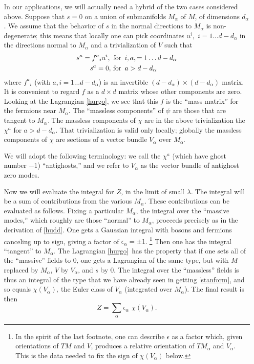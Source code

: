 \documentclass[12pt]{article}
\numberwithin{equation}{section}
\begin{document}
In our applications, we will actually need a hybrid of the two cases
considered above.  Suppose that $s=0$ on a union of submanifolds $M_\alpha$
of $M$, of dimensions $d_\alpha$.  We assume that the behavior of $s$ in
the normal directions to $M_\alpha$ is non-degenerate; this means that locally
one can pick coordinates $u^i,\,\,i=1\dots d-d_\alpha$
in the directions normal to $M_\alpha$ and a trivialization of $V$ such that
\begin{equation}
  \label{locoform}
  \begin{aligned}
    s^a = f^a{}_iu^i, \,\,\,&{\rm for}\,\,\,i,a,=1\dots d-d_\alpha\\
    s^a=0, \,\,&{\rm  for}\,\,\, a>d-d_\alpha \\
  \end{aligned}
\end{equation}
where $f^a{}_i$ (with $a,i=1\dots d-d_\alpha$) is  an invertible
$(d-d_\alpha)\times (d-d_\alpha)$
matrix.   It is convenient to regard $f$ as a $d\times d$ matrix whose
other components are zero.
Looking at the Lagrangian \eqref{hurgo}, we see that this $f$ is the
``mass matrix'' for the fermions near $M_\alpha$. The ``massless
components'' of $\psi$ are those that are tangent to $M_\alpha$.  The
massless components of $\chi$ are in the above trivialization the
$\chi^a$ for $a>d-d_\alpha$.  That trivialization is valid only locally;
globally the massless components of $\chi$ are sections of a vector
bundle $V_\alpha$ over $M_\alpha$.

We will adopt the following terminology: we call the $\chi^a$
(which have ghost number $-1$) ``antighosts,'' and we  refer to
$V_\alpha$ as the vector bundle of antighost zero modes.

Now we will evaluate the integral for $Z$, in the limit of small $\lambda$.
The integral will be a sum of contributions from the various $M_\alpha$.
These contributions can be evaluated as follows.  Fixing a particular
$M_\alpha$, the integral over the ``massive modes,'' which roughly are
those ``normal'' to $M_\alpha$, proceeds precisely as in the
derivation of \eqref{hudd}.  One gets a Gaussian integral with bosons
and fermions canceling up to sign, giving a factor of $\epsilon_\alpha=\pm 1$.
\footnote{In the spirit of the last footnote, one can describe
  $\epsilon$ as a factor which, given orientations of $TM$ and $V$,
  produces a relative orientation of $TM_\alpha$ and $V_\alpha$. This
is the data needed to fix the sign of $\chi(V_\alpha)$ below.}
Then one has the integral ``tangent'' to $M_\alpha$.  The Lagrangian
\eqref{hurgo}\ has the property that if one sets all of the ``massive'' fields
to 0, one gets a Lagrangian of the same type, but with $M$ replaced
by $M_\alpha$, $V$ by $V_\alpha$, and $s$ by 0.
The integral over the ``massless''
fields is thus an integral of the type that we have already seen
in getting \eqref{stanform}, and so equals $\chi(V_\alpha)$, the Euler class
of $V_\alpha$ (integrated over $M_\alpha$).  The final result is then
\begin{equation}
  \label{hurf}
  Z= \sum_\alpha \epsilon_\alpha \,\,\chi(V_\alpha).
\end{equation}
\end{document}
